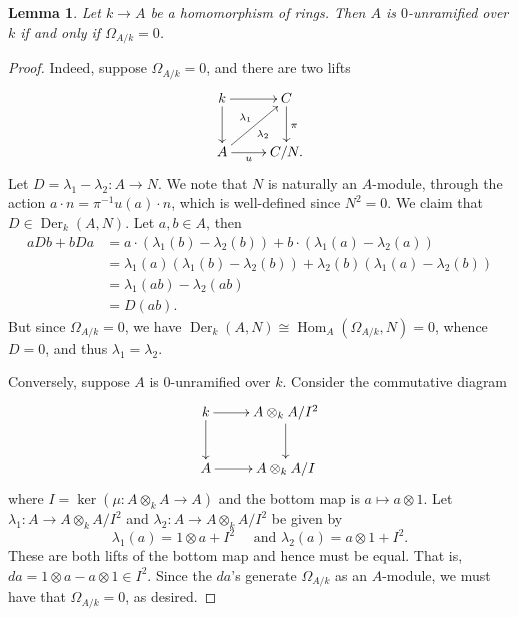 \documentclass[10pt]{article}
\theoremstyle{thmstyle}
\newtheorem{lemma}[theorem]{Lemma}
\theoremstyle{defstyle}
\newcommand{\Hom}{\operatorname{Hom}}
\newcommand{\Der}{\operatorname{Der}}
\begin{document}
\begin{lemma}
    Let $k\to A$ be a homomorphism of rings. Then $A$ is $0$-unramified over $k$ if and only if $\Omega_{A/k} = 0$. 
\end{lemma}
\begin{proof}
    Indeed, suppose $\Omega_{A/k} = 0$, and there are two lifts 
    \begin{equation*}
        \xymatrix {
            k\ar[r]\ar[d] & C\ar[d]^\pi\\
            A\ar[r]_-u\ar[ru]^{\lambda_1}_{\lambda_2} & C/N.
        }
    \end{equation*}
    Let $D = \lambda_1 - \lambda_2\colon A\to N$. We note that $N$ is naturally an $A$-module, through the action $a\cdot n = \pi^{-1}u(a)\cdot n$, which is well-defined since $N^2 = 0$. We claim that $D\in\Der_k(A, N)$. Let $a, b\in A$, then 
    \begin{align*}
        aDb + bDa &= a\cdot\left(\lambda_1(b) - \lambda_2(b)\right) + b\cdot\left(\lambda_1(a) - \lambda_2(a)\right)\\
        &= \lambda_1(a)\left(\lambda_1(b) - \lambda_2(b)\right) + \lambda_2(b)\left(\lambda_1(a) - \lambda_2(b)\right)\\
        &= \lambda_1(ab) - \lambda_2(ab)\\
        &= D(ab).
    \end{align*}
    But since $\Omega_{A/k} = 0$, we have $\Der_k(A, N)\cong\Hom_A(\Omega_{A/k}, N) = 0$, whence $D = 0$, and thus $\lambda_1 = \lambda_2$.

    Conversely, suppose $A$ is $0$-unramified over $k$. Consider the commutative diagram 
    \begin{equation*}
        \xymatrix {
            k\ar[r]\ar[d] & A\otimes_k A/I^2\ar[d]\\
            A\ar[r] & A\otimes_k A/I
        }
    \end{equation*}
    where $I = \ker\left(\mu\colon A\otimes_k A\to A\right)$ and the bottom map is $a\mapsto a\otimes 1$. Let $\lambda_1\colon A\to A\otimes_k A/I^2$ and $\lambda_2\colon A\to A\otimes_k A/I^2$ be given by 
    \begin{equation*}
        \lambda_1(a) = 1\otimes a + I^2\quad\text{ and }\lambda_2(a) = a\otimes 1 + I^2.
    \end{equation*}
    These are both lifts of the bottom map and hence must be equal. That is, $da = 1\otimes a - a\otimes 1\in I^2$. Since the $da$'s generate $\Omega_{A/k}$ as an $A$-module, we must have that $\Omega_{A/k} = 0$, as desired.
\end{proof}
\end{document}
